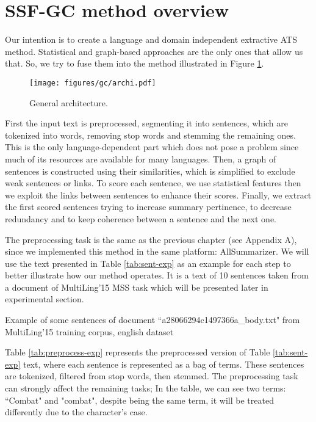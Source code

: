 \section{SSF-GC method overview}

Our intention is to create a language and domain independent extractive ATS method.
Statistical and graph-based approaches are the only ones that allow us that. 
So, we try to fuse them into the method illustrated in Figure \ref{fig:archi}.
%
\begin{figure}[ht]
	\centering
	\texttt{[image: figures/gc/archi.pdf]} %
	\caption{General architecture.}
	\label{fig:archi}
\end{figure}
%
First the input text is preprocessed, segmenting it into sentences, which are tokenized into words, removing stop words and stemming the remaining ones. 
This is the only language-dependent part which does not pose a problem since much of its resources are available for many languages. 
Then, a graph of sentences is constructed using their similarities, which is simplified to exclude weak sentences or links. 
To score each sentence, we use statistical features then we exploit the links between sentences to enhance their scores. 
Finally, we extract the first scored sentences trying to increase summary pertinence, to decrease redundancy and to keep coherence between a sentence and the next one.


The preprocessing task is the same as the previous chapter (see Appendix A), since we implemented this method in the same platform: AllSummarizer. 
We will use the text presented in Table \ref{tab:sent-exp} as an example for each step to better illustrate how our method operates. 
It is a text of 10 sentences taken from a document of MultiLing'15 MSS task which will be presented later in experimental section.  

\begin{table}[ht]
	\centering
	\caption{Example of some sentences of document ``a28066294c1497366a\_body.txt" from MultiLing'15 training corpus, english dataset}
	\label{tab:sent-exp}
	{\scriptsize
	}
\end{table}

Table \ref{tab:preprocess-exp} represents the preprocessed version of Table \ref{tab:sent-exp} text, where each sentence is represented as a bag of terms. 
These sentences are tokenized, filtered from stop words, then stemmed. 
The preprocessing task can strongly affect the remaining tasks; 
In the table, we can see two terms: ``Combat" and "combat", despite being the same term, it will be treated differently due to the character's case.

